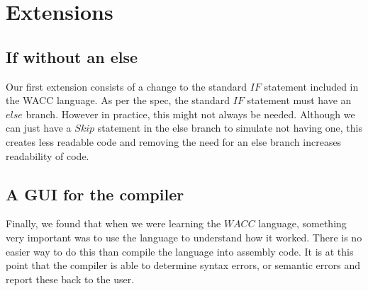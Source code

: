 \documentclass[a4paper, 11pt]{article} %
\begin{document}
\section*{Extensions}


\subsection*{If without an else}
Our first extension consists of a change to the standard $ IF $ statement included in the WACC language. As per the spec, the standard $ IF $ statement must have an $ else $ branch. However in practice, this might not always be needed. Although we can just have a $ Skip $ statement in the else branch to simulate not having one, this creates less readable code and removing the need for an else branch increases readability of code.




\subsection*{A GUI for the compiler}

Finally, we found that when we were learning the $ WACC $ language, something very important was to use the language to understand how it worked. There is no easier way to do this than compile the language into assembly code. It is at this point that the compiler is able to determine syntax errors, or semantic errors and report these back to the user.

\end{document}
